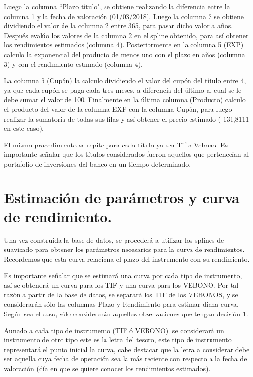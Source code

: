 \hspace{0.4cm} Luego la columna ``Plazo t\'itulo", se obtiene realizando la diferencia entre la columna 1 y la fecha de valoraci\'on (01/03/2018). Luego la columna 3 se obtiene dividiendo el valor de la columna 2 entre 365, para pasar dicho valor a a\~nos. Despu\'es eval\'uo los valores de la columna 2 en el spline obtenido, para as\'i obtener los rendimientos estimados (columna 4). Posteriormente en la columna 5 (EXP) calculo la exponencial del producto de menos uno con el plazo en a\~nos (columna 3) y con el rendimiento estimado (columna 4).


\hspace{0.4cm} La columna 6 (Cup\'on) la calculo dividiendo el valor del cup\'on del t\'itulo entre 4, ya que cada cup\'on se paga cada tres meses, a diferencia del \'ultimo al cual se le debe sumar el valor de 100. Finalmente en la \'ultima columna (Producto) calculo el producto del valor de la columna EXP con la columna Cup\'on, para luego realizar la sumatoria de todas sus filas y as\'i obtener el precio estimado ( 131,8111 en este caso).


\hspace{0.4cm}El mismo procedimiento se repite para cada t\'itulo ya sea Tif o Vebono. Es importante se\~nalar que los t\'itulos considerados fueron aquellos que pertenec\'ian al portafolio de inversiones del banco en un tiempo determinado.

\section{Estimaci\'on de par\'ametros y curva de rendimiento.}

\hspace{0.4cm} Una vez construida la base de datos, se proceder\'a a utilizar los splines de suavizado para obtener los par\'ametros necesarios para la curva de rendimientos. Recordemos que esta curva relaciona el plazo del instrumento con su rendimiento.


\hspace{0.4cm} Es importante se\~nalar que se estimar\'a una curva por cada tipo de instrumento, as\'i se obtendr\'a un curva para los TIF y una curva para los VEBONO. Por tal raz\'on a partir de la base de datos, se separar\'a los TIF de los VEBONOS, y se considerar\'an s\'olo las columnas Plazo y Rendimiento para estimar dicha curva. Seg\'un sea el caso, s\'olo considerar\'an aquellas observaciones que tengan decisi\'on 1.


\hspace{0.4cm} Aunado a cada tipo de instrumento (TIF \'o VEBONO), se considerar\'a un instrumento de otro tipo este es la letra del tesoro, este tipo de instrumento representar\'a el punto inicial la curva, cabe destacar que la letra a considerar debe ser aquella cuya fecha de operaci\'on sea la m\'as reciente con respecto a la fecha de valoraci\'on (d\'ia en que se quiere conocer los rendimientos estimados).


